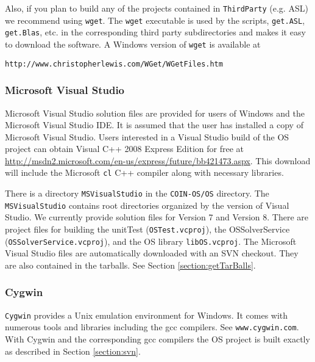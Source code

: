 \documentclass[11pt]{article}
\renewcommand{\_}{{\char"5F}}
\renewcommand{\{}{{\char"7B}}
\renewcommand{\}}{{\char"7D}}
\renewcommand{\^}{{\char"0D}}
\renewcommand{\'}{{\char"0D}}
\begin{document}
Also, if you plan to build any of the projects contained in {\tt ThirdParty} (e.g. ASL) we recommend using {\tt wget}.  The {\tt wget} executable is used by the scripts, {\tt get.ASL}, {\tt get.Blas}, etc. in the corresponding third party subdirectories and makes it easy to download the software.  A Windows version of {\tt wget} is available at

\begin{verbatim}
http://www.christopherlewis.com/WGet/WGetFiles.htm
\end{verbatim}



\subsubsection{Microsoft Visual Studio}

Microsoft Visual Studio solution files are provided for users of Windows and the Microsoft Visual Studio IDE.     It is assumed that the user has installed a copy of Microsoft Visual Studio.  Users interested in a Visual Studio build of the OS project can obtain Visual C++ 2008 Express Edition for free at \url{http://msdn2.microsoft.com/en-us/express/future/bb421473.aspx}.  This download will include the Microsoft {\tt cl}  C++ compiler along with necessary libraries.




There is a directory {\tt MSVisualStudio} in the {\tt COIN-OS/OS}  directory.  The {\tt MSVisualStudio} contains root directories organized by the version of Visual Studio.  We currently provide solution files  for Version 7 and Version 8.  There are project files for building the unitTest ({\tt OSTest.vcproj}),  the OSSolverService ({\tt OSSolverService.vcproj}), and the OS library {\tt libOS.vcproj}.   The Microsoft Visual Studio files are automatically downloaded with an SVN checkout. They are also contained in the tarballs.  See Section \ref{section:getTarBalls}.



\subsubsection{Cygwin}

{\tt Cygwin} provides a Unix emulation environment for Windows. It comes with numerous tools and libraries including the gcc compilers. See {\tt www.cygwin.com}.   With Cygwin and the corresponding gcc compilers the OS project is  built exactly as described in Section \ref{section:svn}.
\end{document}
